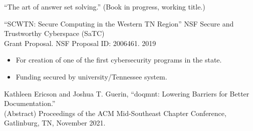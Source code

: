 \documentclass[
    10pt,
    A4,
    english,
    draft = false,
    twoside = false,
]{article}
\begin{document}
        {

        \vspace{-10pt}
        \vspace{-15pt}
        \begin{addmargin}[25pt]{10pt}
          ``The art of answer set solving.'' (Book in progress, working title.)

          \vspace{5pt}
          \hspace{-15pt}
          ``SCWTN: Secure Computing in the Western TN Region'' NSF Secure and Trustworthy Cyberspace (SaTC)\\Grant Proposal. NSF Proposal ID: 2006461. 2019
          \vspace{-5pt}
          \hspace{-5pt}
            \begin{itemize}            
              \setlength{\itemsep}{1pt}                                        
              \setlength{\parskip}{0pt}                                        
              \setlength{\parsep}{0pt}                                         
              \item For creation of one of the first cybersecurity programs in the state.
              \item Funding secured by university/Tennessee system.
            \end{itemize}

            \hspace{-15pt}
            Kathleen Ericson and Joshua T. Guerin, ``doqmnt: Lowering Barriers for Better Documentation.''\\(Abstract) Proceedings of the ACM Mid-Southeast Chapter Conference, Gatlinburg, TN, November 2021.
        \end{addmargin}

}
\end{document}
